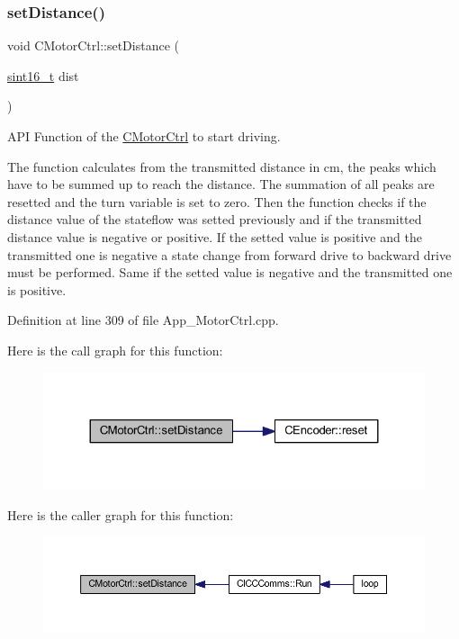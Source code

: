 \subsubsection{\texorpdfstring{set\+Distance()}{setDistance()}}
{\footnotesize\ttfamily void C\+Motor\+Ctrl\+::set\+Distance (\begin{DoxyParamCaption}\item[{\mbox{\hyperlink{_a_d_a_s___types_8h_ae4c9b951dbb7355563c313abca5e2e75}{sint16\+\_\+t}}}]{dist }\end{DoxyParamCaption})}



A\+PI Function of the \mbox{\hyperlink{class_c_motor_ctrl}{C\+Motor\+Ctrl}} to start driving. 

The function calculates from the transmitted distance in cm, the peaks which have to be summed up to reach the distance. The summation of all peaks are resetted and the turn variable is set to zero. Then the function checks if the distance value of the stateflow was setted previously and if the transmitted distance value is negative or positive. If the setted value is positive and the transmitted one is negative a state change from forward drive to backward drive must be performed. Same if the setted value is negative and the transmitted one is positive. 

Definition at line 309 of file App\+\_\+\+Motor\+Ctrl.\+cpp.

Here is the call graph for this function\+:
\nopagebreak
\begin{figure}[H]
\begin{center}
\leavevmode
\includegraphics[width=324pt]{class_c_motor_ctrl_a0ae095bb6003ee63086361661f32ad3a_cgraph}
\end{center}
\end{figure}
Here is the caller graph for this function\+:
\nopagebreak
\begin{figure}[H]
\begin{center}
\leavevmode
\includegraphics[width=350pt]{class_c_motor_ctrl_a0ae095bb6003ee63086361661f32ad3a_icgraph}
\end{center}
\end{figure}
\mbox{\label{class_c_motor_ctrl_a5c6d49d9b407e46aad0abe84bcaf16ec}} 
